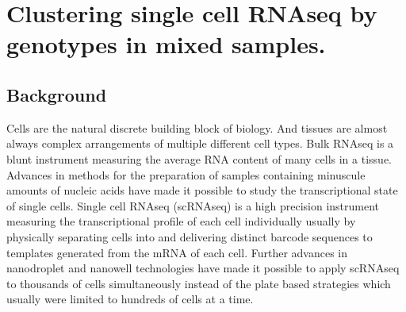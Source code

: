 
\chapter{Clustering single cell RNAseq by genotypes in mixed samples.}

\ifpdf
    \graphicspath{{Chapter2/Figs/Raster/}{Chapter2/Figs/PDF/}{Chapter2/Figs/}}
\else
    \graphicspath{{Chapter2/Figs/Vector/}{Chapter2/Figs/}}
\fi



\section{Background}
\par{
Cells are the natural discrete building block of biology. And tissues are almost always complex arrangements of multiple different cell types. Bulk RNAseq is a blunt 
instrument measuring the average RNA content of many cells in a tissue. 
Advances in methods for the preparation of samples containing minuscule amounts of nucleic acids have made it possible to study the transcriptional state of single cells\cite{first_singlecell}.
Single cell RNAseq (scRNAseq) is a high precision instrument measuring the transcriptional profile of each cell individually usually by physically separating cells into and delivering distinct barcode sequences to templates generated from the mRNA of each cell\cite{smartseq2}.
Further advances in nanodroplet and nanowell technologies have made it possible to apply scRNAseq to thousands of cells simultaneously\cite{dropseq}\cite{10xsinglecell}\cite{seqwell} instead of the plate based strategies which usually were limited to hundreds of cells at a time\cite{smartseq2}. 
} 





